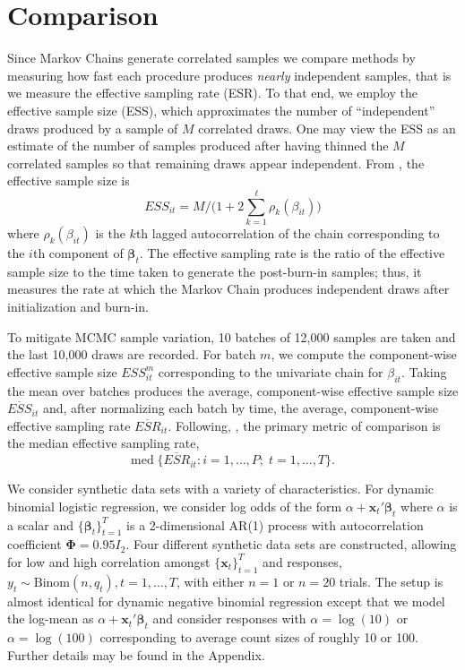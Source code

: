 \documentclass[12pt]{article}
\newcommand{\bbeta}{\boldsymbol{\beta}}
\newcommand{\vx}{\boldsymbol{x}}
\newcommand{\bPhi}{\boldsymbol{\Phi}}
\begin{document}
\section{Comparison}


Since Markov Chains generate correlated samples we compare methods by measuring
how fast each procedure produces \emph{nearly} independent samples, that is we
measure the effective sampling rate (ESR).  To that end, we employ the effective
sample size (ESS), which approximates the number of ``independent'' draws
produced by a sample of $M$ correlated draws.  One may view the ESS as an
estimate of the number of samples produced after having thinned the $M$
correlated samples so that remaining draws appear independent.  From
\cite{holmes-held-2006}, the effective sample size is
\[
ESS_{it} = M / \Big( 1 + 2 \sum_{k=1}^\ell \rho_k(\beta_{it}) \Big)
\]
where $\rho_k(\beta_{it})$ is the $k$th lagged autocorrelation of the chain
corresponding to the $i$th component of $\bbeta_t$.  The effective
sampling rate is the ratio of the effective sample size to the time taken to
generate the post-burn-in samples; thus, it measures the rate at which the
Markov Chain produces independent draws after initialization and burn-in.

To mitigate MCMC sample variation, 10 batches of 12,000 samples are taken and
the last 10,000 draws are recorded.  For batch $m$, we compute the
component-wise effective sample size $ESS_{it}^{m}$ corresponding to the
univariate chain for $\beta_{it}$.  Taking the mean over batches produces the
average, component-wise effective sample size $\overline{ESS}_{it}$ and, after
normalizing each batch by time, the average, component-wise effective sampling
rate $\overline{ESR}_{it}$.  Following,
\cite{fruhwirth-schnatter-fruhwirth-2010}, the primary metric of comparison is
the median effective sampling rate,
\[
\text{med} \; \Big\{ \overline{ESR}_{it} : i=1, \ldots, P; \;  t=1, \ldots, T \Big\}.
\]

We consider synthetic data sets with a variety of characteristics.
For dynamic binomial logistic regression, we consider log odds of the form
$\alpha + \vx_t' \bbeta_t$ where $\alpha$ is a scalar and $\{\bbeta_t\}_{t=1}^T$
is a 2-dimensional AR(1) process with autocorrelation coefficient $\bPhi = 0.95
I_2$.  Four different synthetic data sets are constructed, allowing for low and
high correlation amongst $\{\vx_t\}_{t=1}^T$ and responses, $y_t \sim
\text{Binom}(n, q_t), t=1, \ldots, T$, with either $n=1$ or $n=20$ trials.  The
setup is almost identical for dynamic negative binomial regression except that
we model the log-mean as $\alpha + \vx_t' \bbeta_t$ and consider responses with
$\alpha = \log(10)$ or $\alpha = \log(100)$ corresponding to average count sizes
of roughly 10 or 100.  Further details may be found in the Appendix.
\end{document}
